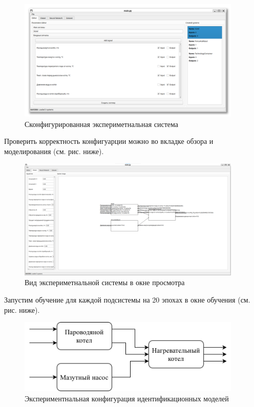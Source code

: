 \begin{figure}[H]
  \begin{center}
    \includegraphics[width=0.95\textwidth]{figures/modules/editor.png}
  \end{center}
  \caption{Сконфигурированная экспериметнальная система}\label{fig:test:configured_system}
\end{figure}

Проверить корректность конфигуарции можно во вкладке обзора и моделирования (см. рис. ниже). 

\begin{figure}[H]
  \begin{center}
    \includegraphics[width=0.95\textwidth]{figures/modules/modelling.png}
  \end{center}
  \caption{Вид экспериметнальной системы в окне просмотра}\label{fig:test:preview}
\end{figure}

Запустим обучение для каждой подсистемы на 20 эпохах в окне обучения (см. рис. ниже). 

\begin{figure}[H]
  \begin{center}
    \includegraphics[width=0.95\textwidth]{figures/subsystem_diagram.png}
  \end{center}
  \caption{Экспериментнальная конфигурация идентификационных моделей}\label{fig:test:neural_form}
\end{figure}

